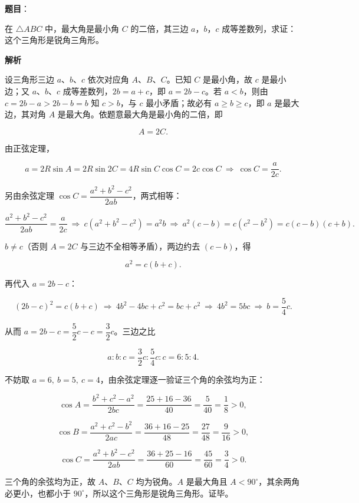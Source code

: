 \begin{answer}

\textbf{题目}：

在 $\triangle ABC$ 中，最大角是最小角 $C$ 的二倍，其三边 $a\text{，}b\text{，}c$ 成等差数列，求证：这个三角形是锐角三角形。

\textbf{解析}

设三角形三边 $a\text{、}b\text{、}c$ 依次对应角 $A\text{、}B\text{、}C$。已知 $C$ 是最小角，故 $c$ 是最小边；又 $a\text{、}b\text{、}c$ 成等差数列，$2b=a+c$，即 $a=2b-c$。若 $a<b$，则由 $c=2b-a>2b-b=b$ 知 $c>b$，与 $c$ 最小矛盾；故必有 $a\ge b\ge c$，即 $a$ 是最大边，其对角 $A$ 是最大角。依题意最大角是最小角的二倍，即

\nopagebreak[4]
\[
A=2C.
\]

由正弦定理，

\nopagebreak[4]
\[
a=2R\sin A=2R\sin2C=4R\sin C\cos C=2c\cos C
\ \Longrightarrow\ \cos C=\frac a{2c}.
\]

另由余弦定理 $\cos C=\dfrac{a^2+b^2-c^2}{2ab}$，两式相等：

\nopagebreak[4]
\[
\frac{a^2+b^2-c^2}{2ab}=\frac a{2c}
\ \Longrightarrow\ c(a^2+b^2-c^2)=a^2b
\ \Longrightarrow\ a^2(c-b)=c(c^2-b^2)=c(c-b)(c+b).
\]

$b\ne c$（否则 $A=2C$ 与三边不全相等矛盾），两边约去 $(c-b)$，得

\nopagebreak[4]
\[
a^2=c(b+c).
\]

再代入 $a=2b-c$：

\nopagebreak[4]
\[
(2b-c)^2=c(b+c)\ \Longrightarrow\ 4b^2-4bc+c^2=bc+c^2\ \Longrightarrow\ 4b^2=5bc\ \Longrightarrow\ b=\frac54c.
\]

从而 $a=2b-c=\dfrac52c-c=\dfrac32c$。三边之比

\nopagebreak[4]
\[
a:b:c=\frac32c:\frac54c:c=6:5:4.
\]

不妨取 $a=6,\ b=5,\ c=4$，由余弦定理逐一验证三个角的余弦均为正：

\nopagebreak[4]
\[
\cos A=\frac{b^2+c^2-a^2}{2bc}=\frac{25+16-36}{40}=\frac5{40}=\frac18>0,
\]

\nopagebreak[4]
\[
\cos B=\frac{a^2+c^2-b^2}{2ac}=\frac{36+16-25}{48}=\frac{27}{48}=\frac9{16}>0,
\]

\nopagebreak[4]
\[
\cos C=\frac{a^2+b^2-c^2}{2ab}=\frac{36+25-16}{60}=\frac{45}{60}=\frac34>0.
\]

三个角的余弦均为正，故 $A\text{、}B\text{、}C$ 均为锐角。$A$ 是最大角且 $A<90^\circ$，其余两角必更小，也都小于 $90^\circ$，所以这个三角形是锐角三角形。证毕。


\end{answer}